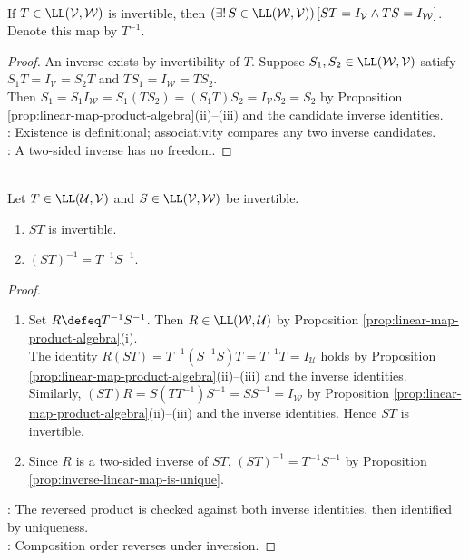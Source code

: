 \begin{proposition} \label{prop:inverse-linear-map-is-unique} \\
If $T\in\LL(\mathcal{V},\mathcal{W})$ is invertible, then $(\exists!\,S\in\LL(\mathcal{W},\mathcal{V}))\,[ST=I_{\mathcal{V}}\land TS=I_{\mathcal{W}}]$. Denote this map by $T^{-1}$.
\begin{proof}
An inverse exists by invertibility of $T$. Suppose $S_1,S_2\in\LL(\mathcal{W},\mathcal{V})$ satisfy $S_1T=I_{\mathcal{V}}=S_2T$ and $TS_1=I_{\mathcal{W}}=TS_2$.\\
Then $S_1=S_1I_{\mathcal{W}}=S_1(TS_2)=(S_1T)S_2=I_{\mathcal{V}}S_2=S_2$ by Proposition \ref{prop:linear-map-product-algebra}(ii)--(iii) and the candidate inverse identities.\\
: Existence is definitional; associativity compares any two inverse candidates.\\
: A two-sided inverse has no freedom.
\end{proof}
\end{proposition}

\begin{proposition} \label{prop:inverse-of-product-linear-maps} \\
Let $T\in\LL(\mathcal{U},\mathcal{V})$ and $S\in\LL(\mathcal{V},\mathcal{W})$ be invertible.
\begin{enumerate}[label=(\roman*)]
\setlength{\itemsep}{0pt}
\item $ST$ is invertible.
\item $(ST)^{-1}=T^{-1}S^{-1}$.
\end{enumerate}
\begin{proof}
\begin{enumerate}[label=(\roman*)]
\setlength{\itemsep}{0pt}
\item Set $R\defeq T^{-1}S^{-1}$. Then $R\in\LL(\mathcal{W},\mathcal{U})$ by Proposition \ref{prop:linear-map-product-algebra}(i).\\
The identity $R(ST)=T^{-1}(S^{-1}S)T=T^{-1}T=I_{\mathcal{U}}$ holds by Proposition \ref{prop:linear-map-product-algebra}(ii)--(iii) and the inverse identities.\\
Similarly, $(ST)R=S(TT^{-1})S^{-1}=SS^{-1}=I_{\mathcal{W}}$ by Proposition \ref{prop:linear-map-product-algebra}(ii)--(iii) and the inverse identities. Hence $ST$ is invertible.
\item Since $R$ is a two-sided inverse of $ST$, $(ST)^{-1}=T^{-1}S^{-1}$ by Proposition \ref{prop:inverse-linear-map-is-unique}.
\end{enumerate}
: The reversed product is checked against both inverse identities, then identified by uniqueness.\\
: Composition order reverses under inversion.
\end{proof}
\end{proposition}

